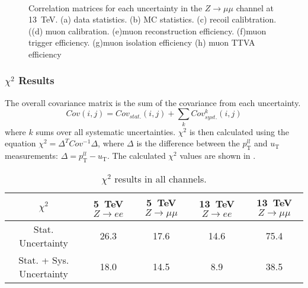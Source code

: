 \begin{figure}[h]
\centering
{}
\\
\caption{Correlation matrices for each uncertainty in the $Z\rightarrow \mu\mu$ channel at 13~TeV. (a) data statistics. (b) MC statistics. (c) recoil calibtration. ((d) muon calibration. (e)muon reconstruction efficiency. (f)muon trigger efficiency. (g)muon isolation efficiency (h) muon TTVA efficiency  }
\label{f:CorrMatrix13TeVZmumu}
\end{figure}

\clearpage
\subsubsection{$\chi^2$ Results}

The overall covariance matrix is the sum of the covariance from each uncertainty.
$$Cov(i,j) = Cov_{stat.}(i,j) + \sum_{k} Cov_{syst.}^{k}(i,j)$$
where $k$ sums over all systematic uncertainties. $\chi^2$ is then calculated using the equation
$\chi^2 = \Delta^T Cov^{-1}  \Delta$, where $\Delta$ is the difference between the $p_{\mathrm{T}}^{ll}$ and $u_\mathrm{T}$ measurements:
$\Delta = p_{\mathrm{T}}^{ll} - u_\mathrm{T}$. The calculated $\chi^2$ values are shown in \Tab{\ref{tab:chi2}}.

\begin{table}[h]
\centering
\begin{tabular}{|c|c|c|c|c|}
\hline
$\chi^2$ & 5~TeV $Z\rightarrow ee$ & 5~TeV $Z\rightarrow \mu\mu$ & 13~TeV $Z\rightarrow ee$ & 13~TeV $Z\rightarrow \mu\mu$\\
\hline
Stat. Uncertainty & 26.3 & 17.6 & 14.6 & 75.4 \\
\hline
Stat. + Sys. Uncertainty & 18.0 & 14.5 & 8.9 & 38.5 \\
\hline
\end{tabular}
\caption{$\chi^2$ results in all channels.}
\label{tab:chi2}
\end{table}

